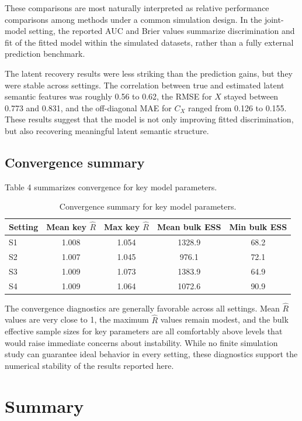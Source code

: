 \documentclass[twoside,11pt]{article}
\begin{document}
These comparisons are most naturally interpreted as relative performance comparisons among methods under a common simulation design. In the joint-model setting, the reported AUC and Brier values summarize discrimination and fit of the fitted model within the simulated datasets, rather than a fully external prediction benchmark.

The latent recovery results were less striking than the prediction gains, but they were stable across settings. The correlation between true and estimated latent semantic features was roughly 0.56 to 0.62, the RMSE for $X$ stayed between 0.773 and 0.831, and the off-diagonal MAE for $C_X$ ranged from 0.126 to 0.155. These results suggest that the model is not only improving fitted discrimination, but also recovering meaningful latent semantic structure.

\subsection{Convergence summary}

Table 4 summarizes convergence for key model parameters.

\begin{table}[H]
\centering
\small
\caption{Convergence summary for key model parameters.}
\begin{tabular}{lcccc}
\hline
Setting & Mean key $\hat R$ & Max key $\hat R$ & Mean bulk ESS & Min bulk ESS \\
\hline
S1 & 1.008 & 1.054 & 1328.9 & 68.2 \\
S2 & 1.007 & 1.045 & 976.1 & 72.1 \\
S3 & 1.009 & 1.073 & 1383.9 & 64.9 \\
S4 & 1.009 & 1.064 & 1072.6 & 90.9 \\
\hline
\end{tabular}
\end{table}

The convergence diagnostics are generally favorable across all settings. Mean $\hat R$ values are very close to 1, the maximum $\hat R$ values remain modest, and the bulk effective sample sizes for key parameters are all comfortably above levels that would raise immediate concerns about instability. While no finite simulation study can guarantee ideal behavior in every setting, these diagnostics support the numerical stability of the results reported here.

\section{Summary}
\end{document}
